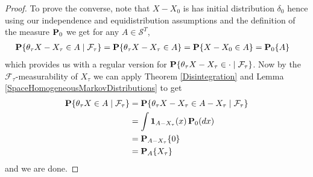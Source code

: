 \begin{proof}
To prove the converse, note that $X - X_0$ is has
initial distribution $\delta_0$ hence using our independence and
equidistribution assumptions and the definition of the measure
$\probabilityop_0$ we get for any $A \in \mathcal{S}^T$,
\begin{align*}
\cprobability{\mathcal{F}_\tau}{\theta_\tau X - X_\tau \in A} &=
\probability{\theta_\tau X - X_\tau \in A} 
=\probability{X - X_0 \in A} 
=\sprobability{A}{0}
\end{align*}
which provides us with a regular version for
$\cprobability{\mathcal{F}_\tau}{\theta_\tau X - X_\tau \in \cdot}$.
Now by the $\mathcal{F}_\tau$-measurability of $X_\tau$ we can apply
Theorem \ref{Disintegration} and Lemma
\ref{SpaceHomogeneousMarkovDistributions} to get
\begin{align*}
\cprobability{\mathcal{F}_\tau}{\theta_\tau X \in A}
&=\cprobability{\mathcal{F}_\tau}{\theta_\tau X - X_\tau \in A-X_\tau}\\
&= \int \characteristic{A-X_\tau}(x) \, \probabilityop_0(dx) \\
&=\sprobability{0}{A - X_\tau} \\
&=\sprobability{X_\tau}{A }
\end{align*}
and we are done.
\end{proof}
